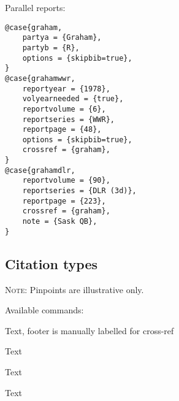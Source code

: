 \newpage
Parallel reports: \par\bigskip
\begin{verbatim}
@case{graham,
	partya = {Graham},
	partyb = {R},
	options = {skipbib=true},
}
@case{grahamwwr,
	reportyear = {1978},
	volyearneeded = {true},
	reportvolume = {6},
	reportseries = {WWR},
	reportpage = {48},
	options = {skipbib=true},
	crossref = {graham},
}
@case{grahamdlr,
	reportvolume = {90},
	reportseries = {DLR (3d)},
	reportpage = {223},
	crossref = {graham},
	note = {Sask QB},
}
\end{verbatim}

\newpage
\subsection{Citation types}
{\footnotesize\textsc{Note}: Pinpoints are illustrative only.}
\bigskip
\bigskip


Available commands:

\numeg
{}
\smallskip
{}

Text, footer is manually labelled for cross-ref\lawcite[\protect\label{fcoleb}][]{cole}
\bigskip
\bigskip

\numeg
{}
\smallskip
{}

Text
\bigskip
\bigskip

\numeg
{}
\smallskip
{}

Text
\bigskip
\bigskip

\numeg
{}
\smallskip
{}

Text
\bigskip
\bigskip




